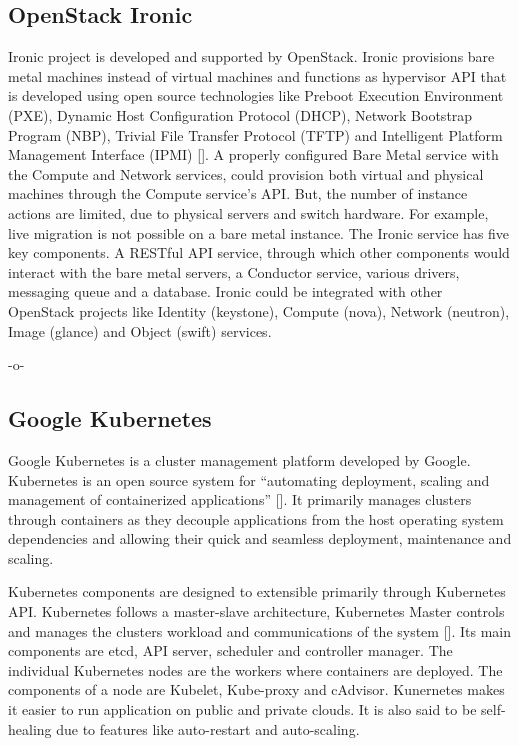 \subsection{OpenStack Ironic}

Ironic project is developed and supported by OpenStack. Ironic
provisions bare metal machines instead of virtual machines and
functions as hypervisor API that is developed using open source
technologies like Preboot Execution Environment (PXE), Dynamic Host
Configuration Protocol (DHCP), Network Bootstrap Program (NBP),
Trivial File Transfer Protocol (TFTP) and Intelligent Platform
Management Interface (IPMI) [\cite{www-ironicwebsite}]. A properly
configured Bare Metal service with the Compute and Network services,
could provision both virtual and physical machines through the Compute
service's API. But, the number of instance actions are limited, due to
physical servers and switch hardware. For example, live migration is
not possible on a bare metal instance. The Ironic service has five key
components. A RESTful API service, through which other components
would interact with the bare metal servers, a Conductor service,
various drivers, messaging queue and a database. Ironic could be
integrated with other OpenStack projects like Identity (keystone),
Compute (nova), Network (neutron), Image (glance) and Object (swift)
services.

     -o-
     
\subsection{Google Kubernetes}

Google Kubernetes is a cluster management platform developed by
Google. Kubernetes is an open source system for ``automating
deployment, scaling and management of containerized
applications'' [\cite{www-kubernetesdoc}]. It primarily manages clusters
through containers as they decouple applications from the host
operating system dependencies and allowing their quick and seamless
deployment, maintenance and scaling.

Kubernetes components are designed to extensible primarily through
Kubernetes API. Kubernetes follows a master-slave architecture,
Kubernetes Master controls and manages the clusters workload and
communications of the system [\cite{www-kuberneteswiki}].  Its main
components are etcd, API server, scheduler and controller manager. The
individual Kubernetes nodes are the workers where containers are
deployed. The components of a node are Kubelet, Kube-proxy and
cAdvisor. Kunernetes makes it easier to run application on public and
private clouds. It is also said to be self-healing due to features
like auto-restart and auto-scaling.

